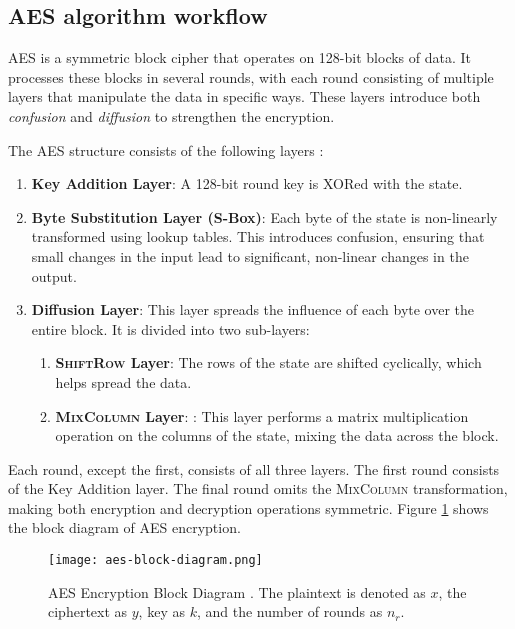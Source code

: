 \subsection{AES algorithm workflow}

\Gls{AES} is a symmetric block cipher that operates on 128-bit blocks of data.
It processes these blocks in several rounds, with each round consisting of multiple layers that manipulate the data in specific ways. 
These layers introduce both \textit{confusion} and \textit{diffusion} to strengthen the encryption.

The AES structure consists of the following layers \cite{Paar2024}:
\begin{enumerate}
    \item \textbf{Key Addition Layer}:
    A 128-bit round key is XORed with the state. 

    \item \textbf{Byte Substitution Layer (S-Box)}:
    Each byte of the state is non-linearly transformed using lookup tables. 
    This introduces confusion, ensuring that small changes in the input lead to significant, non-linear changes in the output.
    
    \item \textbf{Diffusion Layer}:
    This layer spreads the influence of each byte over the entire block. 
    It is divided into two sub-layers:
    \begin{enumerate}
        \item \textbf{\textsc{ShiftRow} Layer}: The rows of the state are shifted cyclically, which helps spread the data. %
        \item \textbf{\textsc{MixColumn} Layer}: : This layer performs a matrix multiplication operation on the columns of the state, mixing the data across the block. %
    \end{enumerate}
\end{enumerate}

Each round, except the first, consists of all three layers. 
The first round consists of the Key Addition layer.
The final round omits the \textsc{MixColumn} transformation, making both encryption and decryption operations symmetric.
Figure \ref{fig:aes-block-diagram} shows the block diagram of AES encryption.

\begin{figure}[h]
    \centering
    \texttt{[image: aes-block-diagram.png]} %
    \caption{
        AES Encryption Block Diagram \cite{Paar2024}.
        The plaintext is denoted as $x$, the ciphertext as $y$, key as $k$, and the number of rounds as $n_r$.
    }
    \label{fig:aes-block-diagram}
\end{figure}